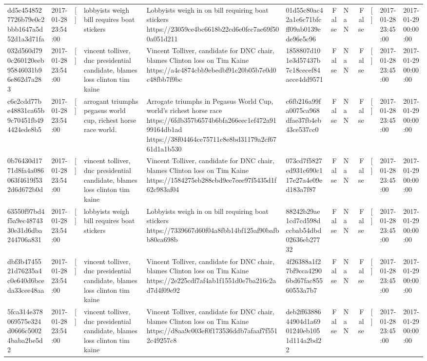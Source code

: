 \begin{tabular}{llllllrlrlll}
dd5c4548527726b79e0c2bbb1647a5d52d1a3d71fa & 2017-01-28 23:54:00 & [] & lobbyists weigh bill requires boat stickers & Lobbyists weigh in on bill requiring boat stickers https://23059ce4bc6618b22cd6e0fcc7ae69f500a051d211 & 01d55c80ac42a1e6c71bfcff09ab0139ede96e5c96 & False & NaN & False & [] & 2017-01-28 23:45:00 & 2017-01-29 00:00:00 \\
032d560d790c260120eeb95846031b96e862d7a283 & 2017-01-28 23:54:00 & [] & vincent tolliver, dnc presidential candidate, blames loss clinton tim kaine & Vincent Tolliver, candidate for DNC chair, blames Clinton loss on Tim Kaine https://a4c4874cbb9ebedbf91c20b05b7e0d0c48fbb7f9bc & 1858807d101e3d57437b7c18cecef84acce4dd9571 & False & NaN & False & [] & 2017-01-28 23:45:00 & 2017-01-29 00:00:00 \\
c6e2cdd77be48831ca65b9c70451fb494424ede8b5 & 2017-01-28 23:54:00 & [] & arrogant triumphs pegasus world cup, richest horse race world. & Arrogate triumphs in Pegasus World Cup, world's richest horse race https://6fdb357b6574b6bfa266eec1ef472a9199164db1ad https://38f04464ce75711c8e8bd31179a2cf6761d1a1b530 & c6fb216a99fa0075ca968dfae37fb4eb43ce537cc0 & False & NaN & False & [] & 2017-01-28 23:45:00 & 2017-01-29 00:00:00 \\
0b76430d1771d8fa4a086063f4619f532d6d672b0d & 2017-01-28 23:54:00 & [] & vincent tolliver, dnc presidential candidate, blames loss clinton tim kaine & Vincent Tolliver, candidate for DNC chair, blames Clinton loss on Tim Kaine https://1584275eb288cbd9ee7eee97f5435d1f62c983af04 & 073cd7f5827ed931c690c117e27a4e09ed183a7f87 & False & NaN & False & [] & 2017-01-28 23:45:00 & 2017-01-29 00:00:00 \\
63550f97bd4f5a9ec4874330e31d6dba244706a831 & 2017-01-28 23:54:00 & [] & lobbyists weigh bill requires boat stickers & Lobbyists weigh in on bill requiring boat stickers https://7339667d60f04a8fbb14bf125af90bafbb80ca698b & 88242b29ae1cd7cd598dccbab54dbd02636eb27732 & False & NaN & False & [] & 2017-01-28 23:45:00 & 2017-01-29 00:00:00 \\
dbf3b4745521d76235a4c0e640d6bceda33cee48aa & 2017-01-28 23:54:00 & [] & vincent tolliver, dnc presidential candidate, blames loss clinton tim kaine & Vincent Tolliver, candidate for DNC chair, blames Clinton loss on Tim Kaine https://2e225cdf7af4ab1f1551d0e7ba216c2ad7d4f09e92 & 4f26388a1f27bf9cca42906bd67fac85560553a7b7 & False & NaN & False & [] & 2017-01-28 23:45:00 & 2017-01-29 00:00:00 \\
5fca314e378069575e324d0666c50024baba2be5d2 & 2017-01-28 23:54:00 & [] & vincent tolliver, dnc presidential candidate, blames loss clinton tim kaine & Vincent Tolliver, candidate for DNC chair, blames Clinton loss on Tim Kaine https://d8aa9c003ef0f173536ddb7afaaf7f5512c49257c8 & deb2ff6388644904d1a6901240eb1051d114a2bd22 & False & NaN & False & [] & 2017-01-28 23:45:00 & 2017-01-29 00:00:00 \\

\end{tabular}

